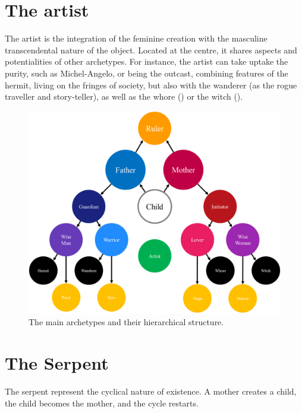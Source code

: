 \documentclass[]{book}
\begin{document}
\hypertarget{the-artist}{%
\section{The artist}\label{the-artist}}

The artist is the integration of the feminine creation with the masculine transcendental nature of the object. Located at the centre, it shares aspects and potentialities of other archetypes. For instance, the artist can take uptake the purity, such as Michel-Angelo, or being the outcast, combining features of the hermit, living on the fringes of society, but also with the wanderer (as the rogue traveller and story-teller), as well as the whore () or the witch ().

\begin{figure}

{\centering \includegraphics[width=\textwidth]{img/archetypes} 

}

\caption{The main archetypes and their hierarchical structure.}\label{fig:unnamed-chunk-10}
\end{figure}

\hypertarget{the-serpent}{%
\section{The Serpent}\label{the-serpent}}

The serpent represent the cyclical nature of existence. A mother creates a child, the child becomes the mother, and the cycle restarts.
\end{document}
